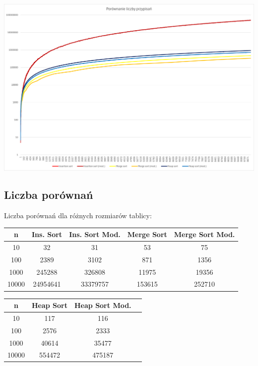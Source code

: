 \documentclass{article}
\begin{document}
\begin{center}
    \includegraphics[width=1\textwidth]{Wykres1.png}
\end{center}

\subsection{Liczba porównań}

Liczba porównań dla różnych rozmiarów tablicy:

\begin{center}
\begin{tabular}{|c|c|c|c|c|}
 \hline
 n & Ins. Sort & Ins. Sort Mod. & Merge Sort & Merge Sort Mod. \\ 
 \hline
 10 & 32 & 31 & 53 & 75 \\
 100 & 2389 & 3102 & 871 & 1356 \\
 1000 & 245288 & 326808 & 11975 & 19356 \\
 10000 & 24954641 & 33379757 & 153615 & 252710 \\
 \hline
\end{tabular}

\vspace{0.5cm}

\begin{tabular}{|c|c|c|c|}
 \hline
 n & Heap Sort & Heap Sort Mod. \\ 
 \hline
 10 & 117 & 116 \\
 100 & 2576 & 2333 \\
 1000 & 40614 & 35477 \\
 10000 & 554472 & 475187 \\
 \hline
\end{tabular}
\end{center}
\end{document}
